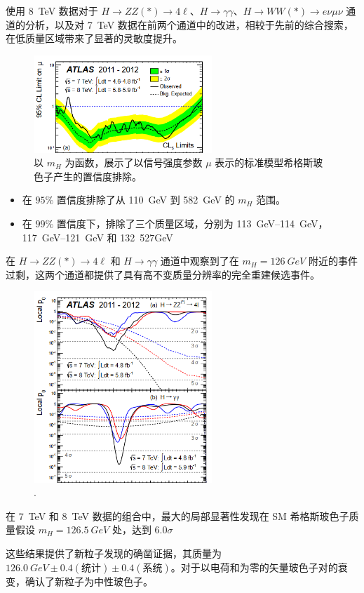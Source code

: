 使用 \qty{8}{TeV} 数据对于 $H\to ZZ(*)\to 4\ell$、$H\to\gamma\gamma$、$H\to WW(*)\to e\nu\mu\nu$ 通道的分析，以及对 \qty{7}{TeV} 数据在前两个通道中的改进，相较于先前的综合搜索，在低质量区域带来了显著的灵敏度提升。

\begin{figure}[htbp]
    \centering
    \includegraphics[width=0.6\textwidth]{pic/95CL.png}
    \caption{以 $m_H$ 为函数，展示了以信号强度参数 $\mu$ 表示的标准模型希格斯玻色子产生的置信度排除。}
    \label{fig:mH}
\end{figure}

\begin{itemize}
    \item 在 $95\%$ 置信度排除了从 \qty{110}{GeV} 到 \qty{582}{GeV} 的 $m_H$ 范围。
    \item 在 $99\%$ 置信度下，排除了三个质量区域，分别为 \qtyrange{113}{114}{GeV}，\qtyrange{117}{121}{GeV} 和 \qty{132}{527}{GeV} 
\end{itemize}

在 $H\to ZZ(*)\to 4\ell$ 和 $H\to\gamma\gamma$ 通道中观察到了在 $m_H=\qty{126}{GeV}$ 附近的事件过剩，这两个通道都提供了具有高不变质量分辨率的完全重建候选事件。

\begin{figure}[htbp]
    \centering
    \includegraphics[width=0.6\textwidth]{pic/p0.png}
    \caption{.}
    \label{fig:p0}
\end{figure}

在 \qty{7}{TeV} 和 \qty{8}{TeV} 数据的组合中，最大的局部显著性发现在 SM 希格斯玻色子质量假设 $m_H=\qty{126.5}{GeV}$ 处，达到 $6.0\sigma$

这些结果提供了新粒子发现的确凿证据，其质量为 $\qty{126.0}{GeV} \pm 0.4(\text{统计}) \pm 0.4(\text{系统})$。对于以电荷和为零的矢量玻色子对的衰变，确认了新粒子为中性玻色子。

